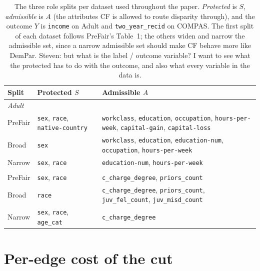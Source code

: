 \documentclass[manuscript,screen,review]{acmart}
\newcommand{\s}[1]{\textcolor{Dandelion}{Steven: #1}}
\begin{document}
\begin{table}[h]
  \caption{The three role splits per dataset used throughout the paper.
  \emph{Protected} is $S$, \emph{admissible} is $A$ (the attributes CF is
  allowed to route disparity through), and the outcome $Y$ is
  \texttt{income} on Adult and \texttt{two\_year\_recid} on COMPAS. The
  first split of each dataset follows PreFair's Table~1; the others widen
  and narrow the admissible set, since a narrow admissible set should make
  CF behave more like DemPar. \s{but what is the label / outcome variable? I want to see what the protected has to do with the outcome, and also what every variable in the data is.}}
  \label{tab:roles}
  \centering
  \footnotesize
  \setlength{\tabcolsep}{4pt}
  \begin{tabular}{@{}l p{} p{}@{}}
    \toprule
    Split & Protected $S$ & Admissible $A$ \\
    \midrule
    \multicolumn{3}{l}{\textit{Adult}} \\
    PreFair       & \texttt{sex}, \texttt{race}, \texttt{native-country} & \texttt{workclass}, \texttt{education}, \texttt{occupation}, \texttt{hours-per-week}, \texttt{capital-gain}, \texttt{capital-loss} \\
    Broad         & \texttt{sex} & \texttt{workclass}, \texttt{education}, \texttt{education-num}, \texttt{occupation}, \texttt{hours-per-week} \\
    Narrow        & \texttt{sex}, \texttt{race} & \texttt{education-num}, \texttt{hours-per-week} \\
    \addlinespace[2pt]
    \multicolumn{3}{l}{\textit{COMPAS}} \\
    PreFair       & \texttt{sex}, \texttt{race} & \texttt{c\_charge\_degree}, \texttt{priors\_count} \\
    Broad         & \texttt{race} & \texttt{c\_charge\_degree}, \texttt{priors\_count}, \texttt{juv\_fel\_count}, \texttt{juv\_misd\_count} \\
    Narrow        & \texttt{sex}, \texttt{race}, \texttt{age\_cat} & \texttt{c\_charge\_degree} \\
    \bottomrule
  \end{tabular}
\end{table}

\section{Per-edge cost of the cut}
\label{app:per_edge_cost}
\end{document}
